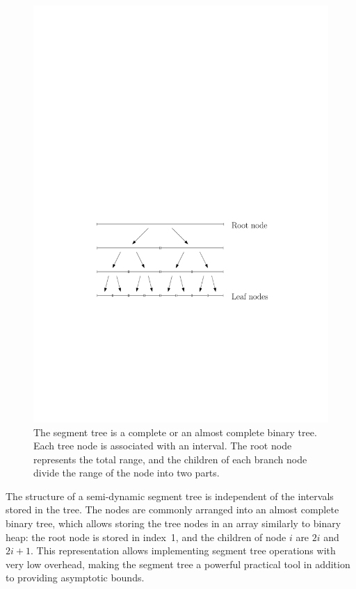 \documentclass[english,gradu]{tktltiki2018}
\begin{document}
\begin{figure}\centering
	\includegraphics[scale=0.7,page=1]{fig/segtree}
	\caption{The segment tree is a complete or an almost complete binary tree.
	Each tree node is associated with an interval.
	The root node represents the total range, and the children of each branch node divide the range of the node into two parts.}\label{fig:segtree}
\end{figure}

The structure of a semi-dynamic segment tree is independent of the intervals stored in the tree.
The nodes are commonly arranged into an almost complete binary tree, which allows storing the tree nodes in an array similarly to binary heap:
the root node is stored in index~1, and the children of node $i$ are $2i$ and $2i+1$.
This representation allows implementing segment tree operations with very low overhead, making the segment tree a powerful practical tool in addition to providing asymptotic bounds.
\end{document}
